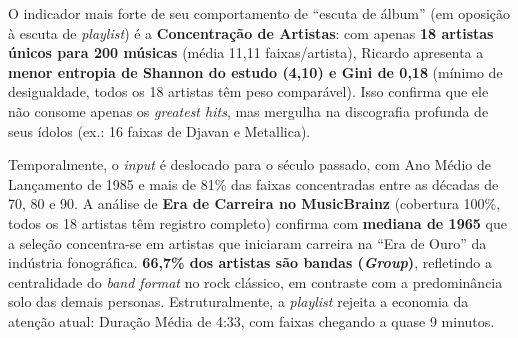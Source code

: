 \documentclass[12pt, %
openright,
oneside, %
a4paper,    %
english,   %
brazil]{facom-ufu-abntex2}
\begin{document}
O indicador mais forte de seu comportamento de ``escuta de álbum'' (em oposição à
escuta de \emph{playlist}) é a \textbf{Concentração de Artistas}: com apenas
\textbf{18 artistas únicos para 200 músicas} (média 11,11 faixas/artista),
Ricardo apresenta a \textbf{menor entropia de Shannon do estudo (4,10) e Gini de
0,18} (mínimo de desigualdade, todos os 18 artistas têm peso comparável). Isso
confirma que ele não consome apenas os \emph{greatest hits}, mas mergulha na
discografia profunda de seus ídolos (ex.: 16 faixas de Djavan e Metallica).

Temporalmente, o \emph{input} é deslocado para o século passado, com Ano Médio de
Lançamento de 1985 e mais de 81\% das faixas concentradas entre as décadas de 70,
80 e 90. A análise de \textbf{Era de Carreira no MusicBrainz} (cobertura 100\%, 
todos os 18 artistas têm registro completo) confirma com \textbf{mediana de 1965}
que a seleção concentra-se em artistas que iniciaram carreira na ``Era de Ouro''
da indústria fonográfica. \textbf{66,7\% dos artistas são bandas (\emph{Group})},
refletindo a centralidade do \emph{band format} no rock clássico, em contraste
com a predominância solo das demais personas. Estruturalmente, a \emph{playlist}
rejeita a economia da atenção atual: Duração Média de 4:33, com faixas chegando a
quase 9 minutos.
\end{document}

